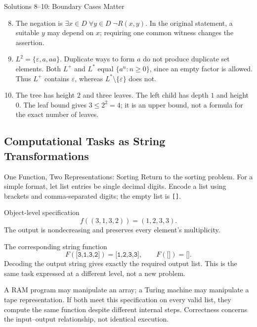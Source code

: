 \documentclass[10pt]{beamer}
\begin{document}
\begin{frame}{Solutions 8--10: Boundary Cases Matter}
  \small
  \begin{enumerate}
    \setcounter{enumi}{7}
    \item The negation is $\exists x\in D\;\forall y\in D\;\neg R(x,y)$.
      In the original statement, a suitable $y$ may depend on $x$;
      requiring one common witness changes the assertion.
    \pause
    \item $L^2=\{\varepsilon,a,aa\}$. Duplicate ways to form $a$ do not
      produce duplicate set elements. Both $L^+$ and $L^*$ equal
      $\{a^n:n\ge0\}$, since an empty factor is allowed. Thus $L^+$
      contains $\varepsilon$, whereas $L^*\setminus\{\varepsilon\}$ does not.
    \pause
    \item The tree has height $2$ and three leaves. The left child has
      depth $1$ and height $0$. The leaf bound gives $3\le2^2=4$;
      it is an upper bound, not a formula for the exact number of leaves.
  \end{enumerate}
\end{frame}

\subsection{Computational Tasks as String Transformations}

\begin{frame}{One Function, Two Representations: Sorting}
  \small
  Return to the sorting problem. For a simple format, let list entries be
  single decimal digits. Encode a list using brackets and comma-separated
  digits; the empty list is \texttt{[]}.
  \begin{block}{Object-level specification}
    \[
      f((3,1,3,2))=(1,2,3,3).
    \]
    The output is nondecreasing and preserves every element's multiplicity.
  \end{block}
  \pause
  \begin{block}{The corresponding string function}
    \[
      F(\texttt{[3,1,3,2]})=\texttt{[1,2,3,3]},\qquad
      F(\texttt{[]})=\texttt{[]}.
    \]
    Decoding the output string gives exactly the required output list.
    This is the same task expressed at a different level, not a new problem.
  \end{block}
  \pause
  A RAM program may manipulate an array; a Turing machine may manipulate
  a tape representation. If both meet this specification on every valid
  list, they compute the same function despite different internal steps.
  Correctness concerns the input--output relationship, not identical execution.
\end{frame}
\end{document}
